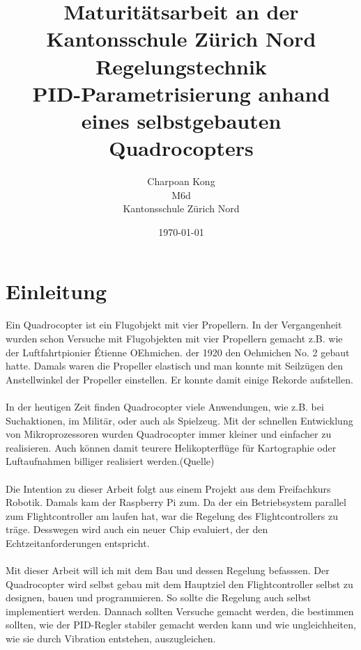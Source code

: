 \documentclass[12pt,a4paper, ngerman]{article}
\begin{document}
\title{\large Maturitätsarbeit an der Kantonsschule Zürich Nord \\ \Huge Regelungstechnik \\ \huge PID-Parametrisierung anhand eines selbstgebauten Quadrocopters}
\date{\today}
\author{Charpoan Kong \\ M6d \\ Kantonsschule Zürich Nord}
\maketitle
{}





\newpage
\clearpage
{}
\tableofcontents
\newpage
{}

\section{Einleitung}
Ein Quadrocopter ist ein Flugobjekt mit vier Propellern. In der Vergangenheit wurden schon Versuche mit Flugobjekten mit vier Propellern gemacht z.B. wie der Luftfahrtpionier Étienne OEhmichen. der 1920 den Oehmichen No. 2 gebaut hatte. Damals waren die Propeller elastisch und man konnte mit Seilzügen den Anstellwinkel der Propeller einstellen. Er konnte damit einige Rekorde aufstellen.\cite{website:Wikipedia_Quadrocopter}\\ \\
In der heutigen Zeit finden Quadrocopter viele Anwendungen, wie z.B. bei Suchaktionen, im Militär, oder auch als Spielzeug. Mit der schnellen Entwicklung von Mikroprozessoren wurden Quadrocopter immer kleiner und einfacher zu realisieren. Auch können damit teurere Helikopterflüge für Kartographie oder Luftaufnahmen billiger realisiert werden.(Quelle)\\ \\
Die Intention zu dieser Arbeit folgt aus einem Projekt aus dem Freifachkurs Robotik. Damals kam der Raspberry Pi zum. Da der ein Betriebsystem parallel zum Flightcontroller am laufen hat, war die Regelung des Flightcontrollers zu träge. Desswegen wird auch ein neuer Chip evaluiert, der den Echtzeitanforderungen entspricht. \\ \\
\iffalse
Mit dieser Arbeit will ich mit dem Bau und dessen Regelung befasssen. Der Quadrocopter wird selbst gebau mit dem Hauptziel den Flightcontroller selbst zu designen, bauen und programmieren. So sollte die Regelung auch selbst implementiert werden. Dannach sollten Versuche gemacht werden, die bestimmen sollten, wie der PID-Regler stabiler gemacht werden kann und wie ungleichheiten, wie sie durch Vibration entstehen, auszugleichen. 
\end{document}

